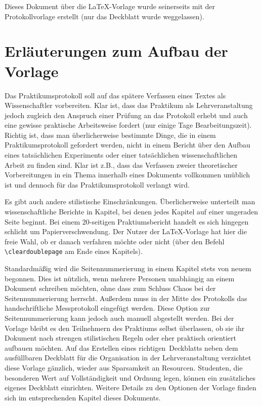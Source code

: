Dieses Dokument über die LaTeX-Vorlage wurde seinerseits mit der Protokollvorlage erstellt (nur das Deckblatt wurde weggelassen).

\section{Erläuterungen zum Aufbau der Vorlage}
Das Praktikumsprotokoll soll auf das spätere Verfassen eines Textes als Wissenschaftler vorbereiten. Klar ist, dass das Praktikum als Lehrveranstaltung jedoch zugleich den Anspruch einer Prüfung an das Protokoll erhebt und auch eine gewisse praktische Arbeitsweise fordert (nur einige Tage Bearbeitungszeit). Richtig ist, dass man überlicherweise bestimmte Dinge, die in einem Praktikumsprotokoll gefordert werden, nicht in einem Bericht über den Aufbau eines tatsächlichen Experiments oder einer tatsächlichen wissenschaftlichen Arbeit zu finden sind. Klar ist z.B., dass das Verfassen zweier theoretischer Vorbereitungen in ein Thema innerhalb eines Dokuments vollkommen unüblich ist und dennoch für das Praktikumsprotokoll verlangt wird.

Es gibt auch andere stilistische Einschränkungen. Überlicherweise unterteilt man wissenschaftliche Berichte in Kapitel, bei denen jedes Kapitel auf einer ungeraden Seite beginnt. Bei einem 20-seitigen Praktiumsbericht handelt es sich hingegen schlicht um Papierverschwendung. Der Nutzer der LaTeX-Vorlage hat hier die freie Wahl, ob er danach verfahren möchte oder nicht (über den Befehl \verb|\cleardoublepage| am Ende eines Kapitels).

Standardmäßig wird die Seitennummerierung in einem Kapitel stets von neuem begonnen. Dies ist nützlich, wenn mehrere Personen unabhängig an einem Dokument schreiben möchten, ohne dass zum Schluss Chaos bei der Seitennummerierung herrscht. Außerdem muss in der Mitte des Protokolls das handschriftliche Messprotokoll eingefügt werden. Diese Option zur Seitennummerierung kann jedoch auch manuell abgestellt werden. Bei der Vorlage bleibt es den Teilnehmern des Praktiums selbst überlassen, ob sie ihr Dokument nach strengen stilistischen Regeln oder eher praktisch orientiert aufbauen möchten. Auf das Erstellen eines \glqq richtigen\grqq\ Deckblatts neben dem ausfüllbaren Deckblatt für die Organisation in der Lehrveranstaltung verzichtet diese Vorlage gänzlich, wieder aus Sparsamkeit an Resourcen. Studenten, die besonderen Wert auf Vollständigkeit und Ordnung legen, können ein zusätzliches eigenes Deckblatt einrichten. Weitere Details zu den Optionen der Vorlage finden sich im entsprechenden Kapitel dieses Dokuments.



